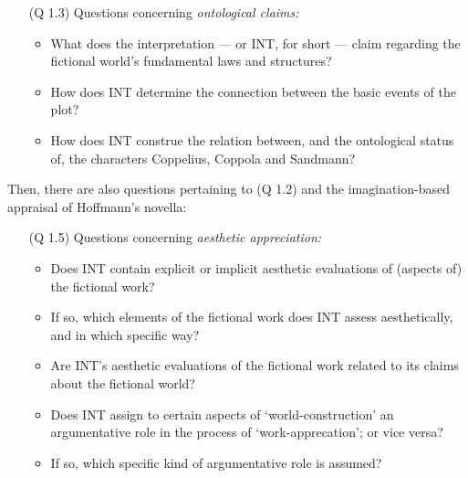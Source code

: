 \vspace{-.1cm}
\begin{itemize}[leftmargin=2cm]
\item[(Q 1.3)] Questions concerning \emph{ontological claims:}
\begin{itemize}
\vspace{-.2cm}
\item What does the interpretation --- or INT, for short --- claim regarding the fictional world’s fundamental laws and structures?
\vspace{-.1cm}
\item How does INT determine the connection between the basic events of the plot?
\vspace{-.1cm}
\item How does INT construe the relation between, and the ontological status of, the characters Coppelius, Coppola and Sandmann? 
\end{itemize}
\end{itemize}
\vspace{-.3cm}

\noindent Then, there are also questions pertaining to (Q 1.2) and the imagination-based appraisal of Hoffmann's novella:

\vspace{-.1cm}
\begin{itemize}[leftmargin=2cm]
\item[(Q 1.5)] Questions concerning \emph{aesthetic appreciation:}
\begin{itemize}
\vspace{-.2cm}
\item Does INT contain explicit or implicit aesthetic evaluations of (aspects of) the fictional work? 
\vspace{-.1cm}
\item If so, which elements of the fictional work does INT assess aesthetically, and in which specific way?
\vspace{-.1cm}
\item Are INT's aesthetic evaluations of the fictional work related to its claims about the fictional world?
\vspace{-.1cm}
\item Does INT assign to certain aspects of `world-construction' an argumentative role in the process of `work-apprecation'; or vice versa?
\vspace{-.1cm}
\item If so, which specific kind of argumentative role is assumed?
\end{itemize}
\end{itemize}
\vspace{-.3cm}

